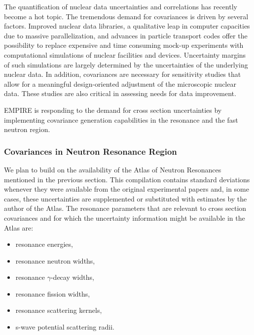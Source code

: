 The quantification of nuclear data uncertainties and correlations has recently
become a hot topic. The tremendous demand for covariances is driven by
several factors. Improved nuclear data libraries, a qualitative leap in
computer capacities due to massive parallelization, and advances in particle
transport codes offer the possibility to replace expensive and time consuming
mock-up experiments with computational simulations of nuclear facilities and
devices. Uncertainty margins of such simulations are largely determined by
the uncertainties of the underlying nuclear data. In addition, covariances
are necessary for sensitivity studies that allow for a meaningful
design-oriented adjustment of the microscopic nuclear data. These studies
are also critical in assessing needs for data improvement.

EMPIRE is responding to the demand for cross section uncertainties by
implementing covariance generation capabilities in the resonance and the
fast neutron region.

\subsubsection{Covariances in Neutron Resonance Region}

We plan to build on the availability of the Atlas of Neutron Resonances~%
\cite{Mughabghab:06} mentioned in the previous section. This compilation
contains standard deviations whenever they were available from the original
experimental papers and, in some cases, these uncertainties are supplemented
or substituted with estimates by the author of the Atlas. The resonance
parameters that are relevant to cross section covariances and for which the
uncertainty information might be available in the Atlas are:

\begin{itemize}
\item resonance energies,

\item resonance neutron widths,

\item resonance $\gamma$-decay widths,

\item resonance fission widths,

\item resonance scattering kernels,

\item s-wave potential scattering radii.
\end{itemize}

